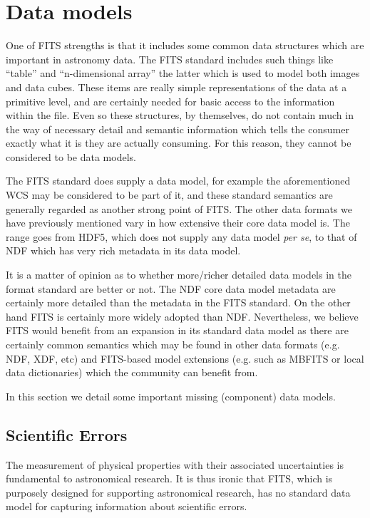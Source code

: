 \documentclass[final,authoryear,5p,times,twocolumn]{elsarticle}
\begin{document}
{{\section{Data models}
\label{section_crit_data_models}

One of FITS strengths is that it includes some common data structures
which are important in astronomy data. The FITS standard includes such
things like ``table'' and ``n-dimensional array'' the latter which is
used to model both images and data cubes.  These items are really simple
representations of the data at a primitive level, and are certainly
needed for basic access to the information within the file.  Even so
these structures, by themselves, do not contain much in the way of necessary
detail and semantic information which tells the consumer exactly what
it is they are actually consuming. For this reason, they cannot be considered to
be data models.


The FITS standard does supply a data model, for example the aforementioned
WCS may be considered to be part of it, and these standard semantics are generally
regarded as another strong point of FITS.  The other data formats we have
previously mentioned vary in how extensive their core data model is. The range
goes from HDF5, which does not supply any data model \emph{per se}, to that of
NDF which has very rich metadata in its data model.


It is a matter of opinion as to whether more/richer detailed data models in the
format standard are better or not. The NDF core data model metadata are certainly
more detailed than the metadata in the FITS standard. On the other hand FITS is 
certainly more widely adopted than NDF. Nevertheless, we believe FITS would benefit 
from an expansion in its standard data model as there are certainly common semantics 
which may be found in other data formats (e.g. NDF, XDF, etc) and FITS-based model
extensions (e.g. such as MBFITS or local data dictionaries) which the community can 
benefit from.


In this section we detail some important missing (component) data models.


\subsection{Scientific Errors}


The measurement of physical properties with their associated uncertainties
is fundamental to astronomical
research. It is thus ironic that FITS, which is purposely designed for
supporting astronomical research, has no standard data model for
capturing information about scientific errors.


}}
\end{document}

